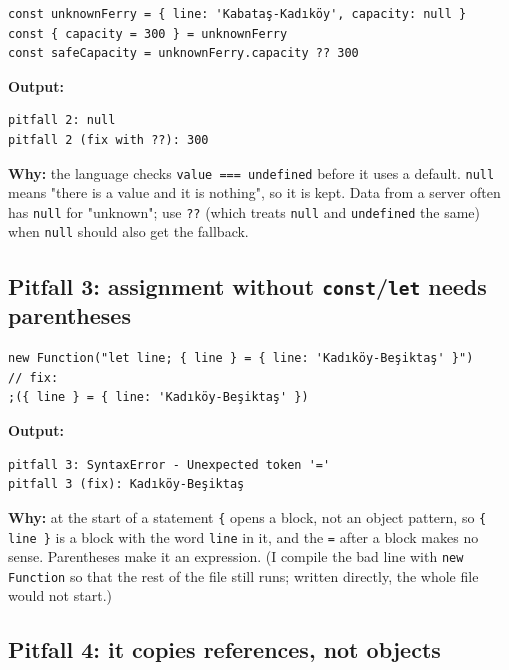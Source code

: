 \documentclass[
  10pt,
]{article}
\begin{document}
\begin{verbatim}
const unknownFerry = { line: 'Kabataş-Kadıköy', capacity: null }
const { capacity = 300 } = unknownFerry
const safeCapacity = unknownFerry.capacity ?? 300
\end{verbatim}

\textbf{Output:}

\begin{verbatim}
pitfall 2: null
pitfall 2 (fix with ??): 300
\end{verbatim}

\textbf{Why:} the language checks
\texttt{value =\allowbreak{}=\allowbreak{}=\allowbreak{} undefined}
before it uses a default. \texttt{null} means "there is a value and it
is nothing", so it is kept. Data from a server often has \texttt{null}
for "unknown"; use \texttt{??} (which treats \texttt{null} and
\texttt{undefined} the same) when \texttt{null} should also get the
fallback.

\hypertarget{pitfall-3-assignment-without-constlet-needs-parentheses}{%
\subsection{\texorpdfstring{Pitfall 3: assignment without
\texttt{const}/\texttt{let} needs
parentheses}{Pitfall 3: assignment without / needs parentheses}}\label{pitfall-3-assignment-without-constlet-needs-parentheses}}

\begin{verbatim}
new Function("let line; { line } = { line: 'Kadıköy-Beşiktaş' }")
// fix:
;({ line } = { line: 'Kadıköy-Beşiktaş' })
\end{verbatim}

\textbf{Output:}

\begin{verbatim}
pitfall 3: SyntaxError - Unexpected token '='
pitfall 3 (fix): Kadıköy-Beşiktaş
\end{verbatim}

\textbf{Why:} at the start of a statement \texttt{\{} opens a block, not
an object pattern, so \texttt{\{ line \}} is a block with the word
\texttt{line} in it, and the \texttt{=\allowbreak{}} after a block makes
no sense. Parentheses make it an expression. (I compile the bad line
with \texttt{new Function} so that the rest of the file still runs;
written directly, the whole file would not start.)

\hypertarget{pitfall-4-it-copies-references-not-objects}{%
\subsection{Pitfall 4: it copies references, not
objects}\label{pitfall-4-it-copies-references-not-objects}}
\end{document}

